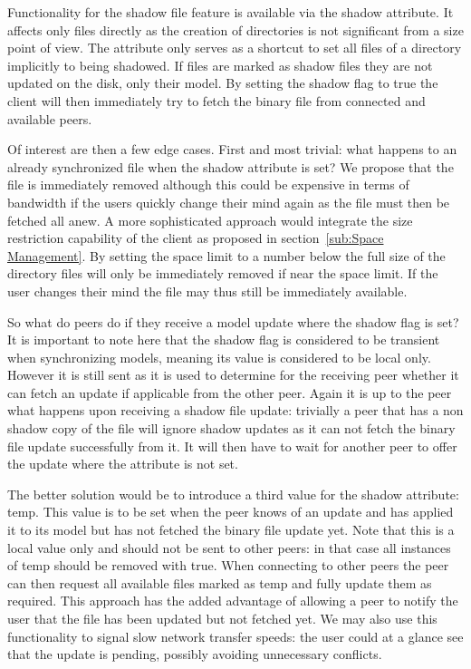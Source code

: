 Functionality for the shadow file feature is available via the shadow attribute.
It affects only files directly as the creation of directories is not significant from a size point of view.
The attribute only serves as a shortcut to set all files of a directory implicitly to being shadowed.
If files are marked as shadow files they are not updated on the disk, only their model.
By setting the shadow flag to true the client will then immediately try to fetch the binary file from connected and available peers.

Of interest are then a few edge cases.
First and most trivial: what happens to an already synchronized file when the shadow attribute is set?
We propose that the file is immediately removed although this could be expensive in terms of bandwidth if the users quickly change their mind again as the file must then be fetched all anew.
A more sophisticated approach would integrate the size restriction capability of the client as proposed in section~\ref{sub:Space Management}.
By setting the space limit to a number below the full size of the directory files will only be immediately removed if near the space limit.
If the user changes their mind the file may thus still be immediately available.

So what do peers do if they receive a model update where the shadow flag is set?
It is important to note here that the shadow flag is considered to be transient when synchronizing models, meaning its value is considered to be local only.
However it is still sent as it is used to determine for the receiving peer whether it can fetch an update if applicable from the other peer.
Again it is up to the peer what happens upon receiving a shadow file update: trivially a peer that has a non shadow copy of the file will ignore shadow updates as it can not fetch the binary file update successfully from it.
It will then have to wait for another peer to offer the update where the attribute is not set.

The better solution would be to introduce a third value for the shadow attribute: temp.
This value is to be set when the peer knows of an update and has applied it to its model but has not fetched the binary file update yet.
Note that this is a local value only and should not be sent to other peers: in that case all instances of temp should be removed with true.
When connecting to other peers the peer can then request all available files marked as temp and fully update them as required.
This approach has the added advantage of allowing a peer to notify the user that the file has been updated but not fetched yet.
We may also use this functionality to signal slow network transfer speeds: the user could at a glance see that the update is pending, possibly avoiding unnecessary conflicts.

